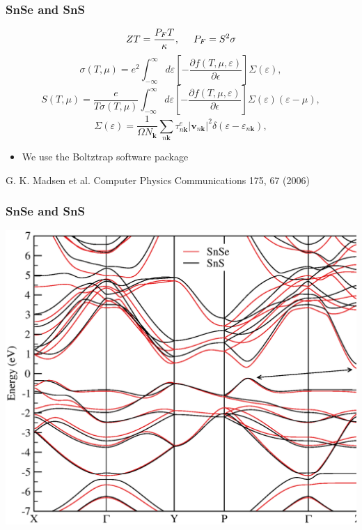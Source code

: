 \documentclass{beamer}
\begin{document}
\begin{frame}

\frametitle{SnSe and SnS}
\begin{equation}
\nonumber
 ZT=\frac{P_{F}T}{\kappa}, \hspace{0.5cm} P_{F}=S^{2}\sigma
\end{equation}
\begin{equation}
\nonumber
\sigma(T,\mu) = e^2 \int_{-\infty}^{\infty} d\varepsilon \left[-\frac{\partial f(T,\mu,\varepsilon)}{\partial\epsilon}\right] \Sigma(\varepsilon),
\end{equation}
\begin{equation}
 \nonumber
 S(T,\mu) = \frac{e}{T\sigma(T,\mu)} \int_{-\infty}^{\infty} d\varepsilon \left[-\frac{\partial f(T,\mu,\varepsilon)}{\partial\epsilon}\right] \Sigma(\varepsilon) (\varepsilon - \mu),
\end{equation}
\begin{equation}
\nonumber
\Sigma(\varepsilon) = \frac{1}{\Omega N_{\mathbf{k}}} \sum_{n\mathbf{k}} \tau^e_{n\mathbf{k}}  |\mathbf{v}_{n\mathbf{k}}|^{2} \delta( \varepsilon-\varepsilon_{n\mathbf{k}} ),
\end{equation}
\begin{itemize}
 \item We use the Boltztrap software package
\end{itemize}
\begin{tiny}
 G. K. Madsen et al. Computer Physics Communications 175, 67 (2006)
\end{tiny}

\end{frame}


\begin{frame}

\frametitle{SnSe and SnS}
\vspace{-0.5cm}
\begin{center}
 \includegraphics[width=0.75\linewidth]{Pictures/SnS/bands.eps}
\end{center}

\end{frame}
\end{document}
